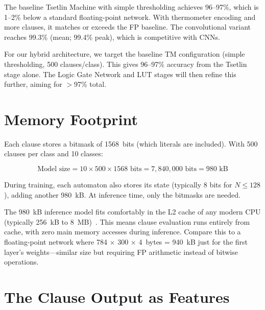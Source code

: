 The baseline Tsetlin Machine with simple thresholding achieves
96--97\%, which is 1--2\% below a standard floating-point network.
With thermometer encoding and more clauses, it matches or exceeds
the FP baseline. The convolutional variant~\cite{granmo2019convtm} reaches 99.3\%
(mean; 99.4\% peak), which is competitive with CNNs.

\begin{engineernote}
For our hybrid architecture, we target the baseline TM configuration
(simple thresholding, 500 clauses/class). This gives 96--97\%
accuracy from the Tsetlin stage alone. The Logic Gate Network and
LUT stages will then refine this further, aiming for $>$97\% total.
\end{engineernote}


\section{Memory Footprint}
\label{sec:tm-memory}

Each clause stores a bitmask of 1568~bits (which literals are
included). With 500 clauses per class and 10 classes:

\begin{equation}
  \text{Model size} = 10 \times 500 \times 1568 \text{ bits}
    = 7{,}840{,}000 \text{ bits} = 980 \text{ kB}
  \label{eq:tm-model-size}
\end{equation}

During training, each automaton also stores its state (typically 8
bits for $N \leq 128$), adding another 980~kB. At inference time,
only the bitmasks are needed.

\begin{engineernote}
The 980~kB inference model fits comfortably in the L2 cache of any
modern CPU (typically 256~kB to 8~MB)~\cite{wheeldon2020pervasive}. This means clause evaluation
runs entirely from cache, with zero main memory accesses during
inference. Compare this to a floating-point network where 784 $\times$
300 $\times$ 4~bytes = 940~kB just for the first layer's weights---similar
size but requiring FP arithmetic instead of bitwise operations.
\end{engineernote}


\section{The Clause Output as Features}
\label{sec:clause-features}

